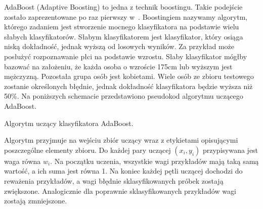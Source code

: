 AdaBoost (Adaptive Boosting) to jedna z technik boostingu.
Takie podejście zostało zaprezentowane po raz pierwszy w~\cite{Freund1996ExperimentsWA}.
Boostingiem nazywamy algorytm, którego zadaniem jest stworzenie mocnego klasyfikatora na podstawie wielu słabych klasyfikatorów.
Słabym klasyfikatorem jest klasyfikator, który osiąga niską dokładność, jednak wyższą od losowych wyników.
Za przykład może posłużyć rozpoznawanie płci na podstawie wzrostu.
Słaby klasyfikator mógłby bazować na założeniu, że każda osoba o wzroście 175cm lub wyższym jest mężczyzną.
Pozostała grupa osób jest kobietami.
Wiele osób ze zbioru testowego zostanie określonych błędnie, jednak dokładność klasyfikatora będzie wyższa niż 50\%.
Na poniższych schemacie przedstawiono pseudokod algorytmu uczącego AdaBoost.
\begin{algorithm}
    \caption{Algorytm uczący klasyfikatora AdaBoost.}
\end{algorithm}
\FloatBarrier
Algorytm przyjmuje na wejściu zbiór uczący wraz z etykietami opisującymi poszczególne elementy zbioru.
Do każdej pary uczącej $(x_i, y_i)$ przypisywana jest waga równa $w_i$.
Na początku uczenia, wszystkie wagi przykładów mają taką samą wartość, a ich suma jest równa 1.
Na koniec każdej pętli uczącej dochodzi do reważenia przykładów, a wagi błędnie sklasyfikowanych próbek zostają zwiększone.
Analogicznie dla poprawnie sklasyfikowanych przykładów wagi zostają zmniejszone.
